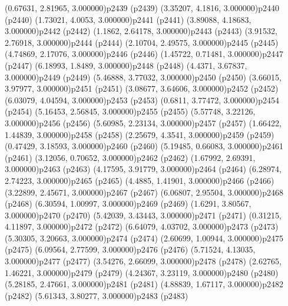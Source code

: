 \psPoint(0.67631, 2.81965, 3.000000){p2439}
\psdot(p2439)
\psPoint(3.35207, 4.1816, 3.000000){p2440}
\psdot(p2440)
\psPoint(1.73021, 4.0053, 3.000000){p2441}
\psdot(p2441)
\psPoint(3.89088, 4.18683, 3.000000){p2442}
\psdot(p2442)
\psPoint(1.1862, 2.64178, 3.000000){p2443}
\psdot(p2443)
\psPoint(3.91532, 2.76918, 3.000000){p2444}
\psdot(p2444)
\psPoint(2.10704, 2.49575, 3.000000){p2445}
\psdot(p2445)
\psPoint(4.74869, 2.17076, 3.000000){p2446}
\psdot(p2446)
\psPoint(1.45722, 0.71481, 3.000000){p2447}
\psdot(p2447)
\psPoint(6.18993, 1.8489, 3.000000){p2448}
\psdot(p2448)
\psPoint(4.4371, 3.67837, 3.000000){p2449}
\psdot(p2449)
\psPoint(5.46888, 3.77032, 3.000000){p2450}
\psdot(p2450)
\psPoint(3.66015, 3.97977, 3.000000){p2451}
\psdot(p2451)
\psPoint(3.08677, 3.64606, 3.000000){p2452}
\psdot(p2452)
\psPoint(6.03079, 4.04594, 3.000000){p2453}
\psdot(p2453)
\psPoint(0.6811, 3.77472, 3.000000){p2454}
\psdot(p2454)
\psPoint(5.16453, 2.56845, 3.000000){p2455}
\psdot(p2455)
\psPoint(5.57748, 3.22126, 3.000000){p2456}
\psdot(p2456)
\psPoint(5.60985, 2.23134, 3.000000){p2457}
\psdot(p2457)
\psPoint(1.66422, 1.44839, 3.000000){p2458}
\psdot(p2458)
\psPoint(2.25679, 4.3541, 3.000000){p2459}
\psdot(p2459)
\psPoint(0.47429, 3.18593, 3.000000){p2460}
\psdot(p2460)
\psPoint(5.19485, 0.66083, 3.000000){p2461}
\psdot(p2461)
\psPoint(3.12056, 0.70652, 3.000000){p2462}
\psdot(p2462)
\psPoint(1.67992, 2.69391, 3.000000){p2463}
\psdot(p2463)
\psPoint(4.17595, 3.91779, 3.000000){p2464}
\psdot(p2464)
\psPoint(6.28974, 2.74223, 3.000000){p2465}
\psdot(p2465)
\psPoint(4.4885, 1.41901, 3.000000){p2466}
\psdot(p2466)
\psPoint(3.22899, 2.45671, 3.000000){p2467}
\psdot(p2467)
\psPoint(6.06807, 2.95504, 3.000000){p2468}
\psdot(p2468)
\psPoint(6.30594, 1.00997, 3.000000){p2469}
\psdot(p2469)
\psPoint(1.6291, 3.80567, 3.000000){p2470}
\psdot(p2470)
\psPoint(5.42039, 3.43443, 3.000000){p2471}
\psdot(p2471)
\psPoint(0.31215, 4.11897, 3.000000){p2472}
\psdot(p2472)
\psPoint(6.64079, 4.03702, 3.000000){p2473}
\psdot(p2473)
\psPoint(5.30305, 3.20663, 3.000000){p2474}
\psdot(p2474)
\psPoint(2.60699, 1.00944, 3.000000){p2475}
\psdot(p2475)
\psPoint(6.09564, 2.77599, 3.000000){p2476}
\psdot(p2476)
\psPoint(5.71524, 4.13035, 3.000000){p2477}
\psdot(p2477)
\psPoint(3.54276, 2.66099, 3.000000){p2478}
\psdot(p2478)
\psPoint(2.62765, 1.46221, 3.000000){p2479}
\psdot(p2479)
\psPoint(4.24367, 3.23119, 3.000000){p2480}
\psdot(p2480)
\psPoint(5.28185, 2.47661, 3.000000){p2481}
\psdot(p2481)
\psPoint(4.88839, 1.67117, 3.000000){p2482}
\psdot(p2482)
\psPoint(5.61343, 3.80277, 3.000000){p2483}
\psdot(p2483)
